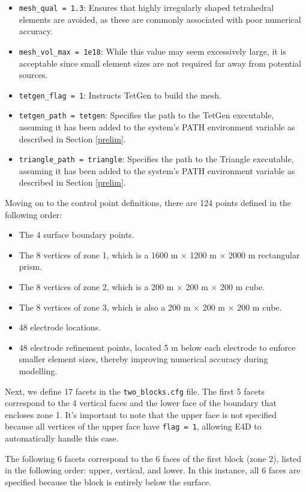 \documentclass[a4paper,12pt]{article}
\begin{document}
\begin{itemize}
    \item \texttt{mesh\_qual = 1.3}: Ensures that highly irregularly shaped tetrahedral elements are avoided, as these are commonly associated with poor numerical accuracy.
    \item \texttt{mesh\_vol\_max = 1e18}: While this value may seem excessively large, it is acceptable since small element sizes are not required far away from potential sources.
    \item \texttt{tetgen\_flag = 1}: Instructs TetGen to build the mesh.
    \item \texttt{tetgen\_path = tetgen}: Specifies the path to the TetGen executable, assuming it has been added to the system's PATH environment variable as described in Section \ref{prelim}.
    \item \texttt{triangle\_path = triangle}: Specifies the path to the Triangle executable, assuming it has been added to the system's PATH environment variable as described in Section \ref{prelim}.
\end{itemize}

Moving on to the control point definitions, there are 124 points defined in the following order:

\begin{itemize}
    \item The 4 surface boundary points.
    \item The 8 vertices of zone 1, which is a 1600 m × 1200 m × 2000 m rectangular prism.
    \item The 8 vertices of zone 2, which is a 200 m × 200 m × 200 m cube.
    \item The 8 vertices of zone 3, which is also a 200 m × 200 m × 200 m cube.
    \item 48 electrode locations.
    \item 48 electrode refinement points, located 5 m below each electrode to enforce smaller element sizes, thereby improving numerical accuracy during modelling.
\end{itemize}

Next, we define 17 facets in the \texttt{two\_blocks.cfg} file. The first 5 facets correspond to the 4 vertical faces and the lower face of the boundary that encloses zone 1. It’s important to note that the upper face is not specified because all vertices of the upper face have \texttt{flag = 1}, allowing E4D to automatically handle this case.

The following 6 facets correspond to the 6 faces of the first block (zone 2), listed in the following order: upper, vertical, and lower. In this instance, all 6 faces are specified because the block is entirely below the surface.
\end{document}
